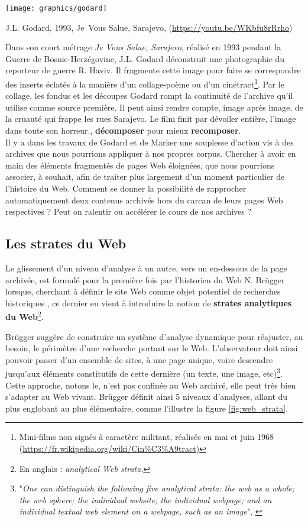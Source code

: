 \documentclass[symmetric,justified,marginals=raggedouter]{tufte-book}
\begin{document}
\begin{marginfigure}%
  \texttt{[image: graphics/godard]}
  \caption{J.L. Godard, 1993, Je~Vous Salue, Sarajevo, (\url{https://youtu.be/WKbfu8rRrho})}
  \label{fig:godard}
\end{marginfigure}

Dans son court métrage \textit{Je Vous Salue, Sarajevo}, réalisé en 1993 pendant la Guerre de Bosnie-Herzégovine, J.L. Godard déconstruit une photographie du reporteur de guerre R. Haviv. Il fragmente cette image pour faire se correspondre des inserts éclatés à la manière d'un collage-poème ou d'un cinétract\footnote{Mini-films non signés à caractère militant, réalisés en mai et juin 1968 (\url{https://fr.wikipedia.org/wiki/Cin\%C3\%A9tract})}. Par le collage, les fondus et les découpes Godard rompt la continuité de l'archive qu'il utilise comme source première. Il peut ainsi rendre compte, image après image, de la cruauté qui frappe les rues Sarajevo. Le film finit par dévoiler entière, l'image dans toute son horreur., \textbf{décomposer} pour mieux \textbf{recomposer}.\\

\noindent Il y a dans les travaux de Godard et de Marker une souplesse d'action vis à des archives que nous pourrions appliquer à nos propres corpus. Chercher à avoir en main des éléments fragmentés de pages Web éloignées, que nous pourrions associer, à souhait, afin de traiter plus largement d'un moment particulier de l'histoire du Web. Comment se donner la possibilité de rapprocher automatiquement deux contenus archivés hors du carcan de leurs pages Web respectives ? Peut on ralentir ou accélérer le cours de nos archives ? 

\subsection{Les strates du Web}

\noindent Le glissement d'un niveau d'analyse à un autre, vers un en-dessous de la page archivée, est formulé pour la première fois par l'historien du Web N. Brügger lorsque, cherchant à définir le site Web comme objet potentiel de recherches historiques \citep{brugger_website_2009}, ce dernier en vient à introduire la notion de \textbf{strates analytiques du Web}\footnote{En anglais : \textit{analytical Web strata}.}.

Brügger suggère de construire un système d'analyse dynamique pour réajuster, au besoin, le périmètre d'une recherche portant sur le Web. L'observateur doit ainsi pouvoir passer d'un ensemble de sites, à une page unique, voire descendre jusqu'aux éléments constitutifs de cette dernière (un texte, une image, etc)\footnote{"\textit{One can distinguish the following five analytical strata: the web as a whole; the web sphere; the individual website; the individual webpage; and an individual textual web element on a webpage, such as an image}", \citep[p.19]{brugger_website_2009}}. 
Cette approche, notons le, n'est pas confinée au Web archivé, elle peut très bien s'adapter au Web vivant. Brügger définit ainsi 5 niveaux d'analyses, allant du  plus englobant au plus élémentaire, comme l'illustre la figure \ref{fig:web_strata}.
\end{document}
